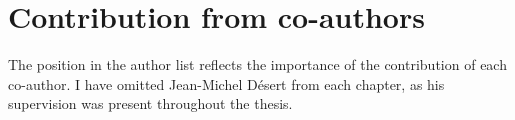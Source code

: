 
\newcommand{\coitem}[1]{\item[Chapter~\ref{#1}:] \nameref{#1}}
\newcommand{\coauthors}[1]{\begin{flushleft} {\rm\normalsize #1} \\ \end{flushleft}}
\newcommand{\cojournal}[1]{\begin{flushleft} {\it\normalsize #1} \\ \medskip \end{flushleft}}
\newcommand{\note}[1]{\begin{flushleft} {\footnotesize \normalsize #1} \\ \medskip \end{flushleft}}

\chapter{Contribution from co-authors}

The position in the author list reflects the importance of the contribution of each co-author. I have omitted Jean-Michel D\'{e}sert from each chapter, as his supervision was present throughout the thesis.

 \bigskip

